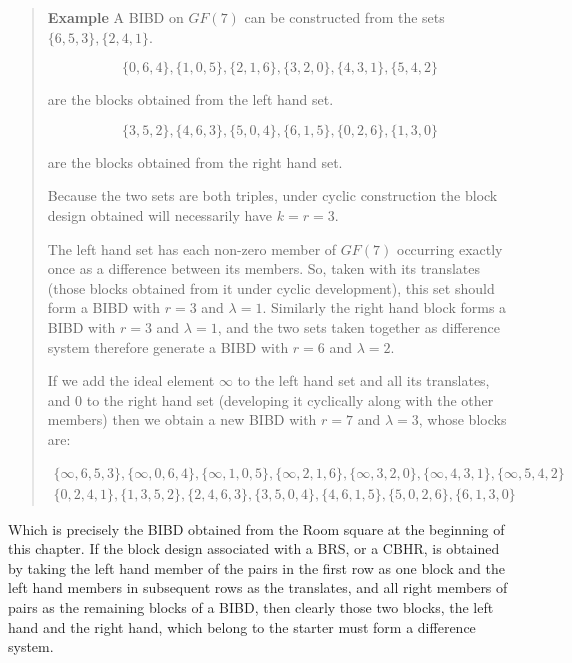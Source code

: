\documentclass[
  11pt,
  a4paper]{book}
\newcounter{examplecounter}
\begin{document}
\begin{quote}  \textbf{Example } \quad 
A BIBD on $GF(7)$ can be constructed from the sets
$\{6, 5, 3\}, \{2, 4, 1\}$.

\begin{equation}
\{0, 6, 4\}, \{1, 0, 5\}, \{2, 1, 6\}, \{3, 2, 0\}, \{4, 3, 1\}, \{5, 4, 2\}
\end{equation}

are the blocks obtained from the left hand set.

\begin{equation}
\{3, 5, 2\}, \{4, 6, 3\}, \{5, 0, 4\}, \{6, 1, 5\}, \{0, 2, 6\}, \{1, 3, 0\}
\end{equation}

are the blocks obtained from the right hand set.

Because the two sets are both triples, under cyclic
construction the block design obtained will necessarily have
$k = r = 3$.

The left hand set has each non-zero member of $GF(7)$
occurring exactly once as a difference between its members.
So, taken with its translates (those blocks obtained from it
under cyclic development), this set should form a BIBD with
$r = 3$ and $\lambda = 1$. Similarly the right hand block forms
a BIBD with $r = 3$ and $\lambda = 1$, and the two sets taken
together as difference system therefore generate a BIBD with
$r = 6$ and $\lambda = 2$.

If we add the ideal element $\infty$ to the left hand set
and all its translates, and 0 to the right hand set
(developing it cyclically along with the other members) then
we obtain a new BIBD with $r = 7$ and $\lambda = 3$, whose
blocks are:

\begin{equation}
\begin{split}
\{\infty,6,5,3\},\{\infty,0,6,4\},\{\infty,1,0,5\},\{\infty,2,1,6\},\{\infty,3,2,0\},\{\infty,4,3,1\},\{\infty,5,4,2\} \\
\{0,2,4,1\},\{1,3,5,2\},\{2,4,6,3\},\{3,5,0,4\},\{4,6,1,5\},\{5,0,2,6\},\{6,1,3,0\}
\end{split}
\end{equation}

 \end{quote}

Which is precisely the BIBD obtained from the Room square at
the beginning of this chapter. If the block design
associated with a BRS, or a CBHR, is obtained by taking the
left hand member of the pairs in the first row as one block
and the left hand members in subsequent rows as the
translates, and all right members of pairs as the remaining
blocks of a BIBD, then clearly those two blocks, the left
hand and the right hand, which belong to the starter must
form a difference system.
\end{document}
